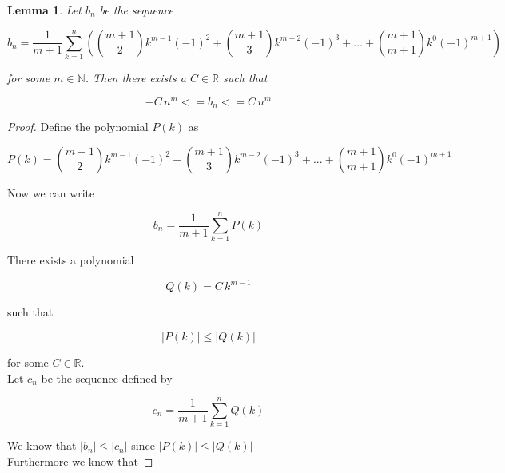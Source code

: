 \documentclass{article}
\newtheorem{lemma}{Lemma}
\begin{document}
\begin{lemma}
Let $b_{n}$ be the sequence 

\begin{equation*}
b_{n} = \frac{1}{m+1} \displaystyle \sum_{k=1}^{n} \left( \binom{m+1}{2} k^{m-1} (-1)^2 +  \binom{m+1}{3} k^{m-2} (-1)^3 + ... +  \binom{m+1}{m+1} k^{0} (-1)^{m+1} \right) 
\end{equation*}

for some $m \in \mathbb{N}$. Then there exists a $C \in \mathbb{R}$ such that

\begin{equation*}
-C \, n^{m} <= b_{n} <= C \, n^{m}
\end{equation*}

\end{lemma}

\begin{proof}
Define the polynomial $P(k)$ as 

\begin{equation*}
P(k) = \binom{m+1}{2} k^{m-1} (-1)^2 +  \binom{m+1}{3} k^{m-2} (-1)^3 + ... +  \binom{m+1}{m+1} k^{0} (-1)^{m+1}
\end{equation*}

Now we can write 

\begin{equation*}
b_{n} = \frac{1}{m+1} \displaystyle \sum_{k=1}^{n} P(k)
\end{equation*}

There exists a polynomial 

\begin{equation*}
Q(k) = C \, k^{m-1}
\end{equation*}

such that 

\begin{equation*}
|P(k)| \le |Q(k)|
\end{equation*}

for some $C \in \mathbb{R}$. \\

Let $c_{n}$ be the sequence defined by

\begin{equation*}
c_{n} = \frac{1}{m+1} \displaystyle \sum_{k=1}^{n} Q(k)
\end{equation*}

We know that $|b_{n}| \le |c_{n}|$ since $|P(k)| \le |Q(k)|$ \\

Furthermore we know that


\end{proof}
\end{document}
